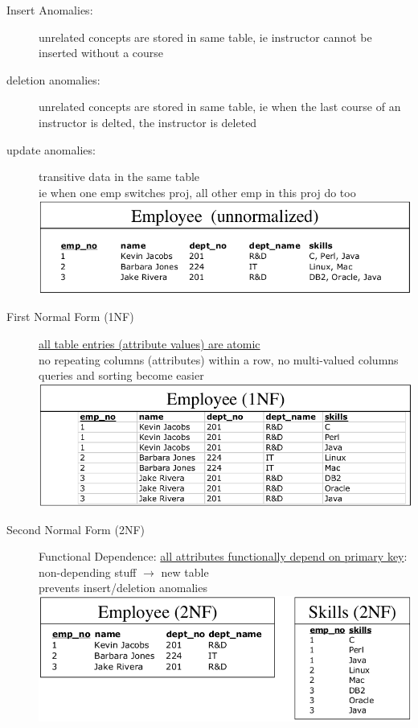 \documentclass{scrartcl}
\begin{document}
\begin{description}
	\item[Insert Anomalies:] unrelated concepts are stored in same table, ie instructor cannot be inserted without a course
	\item[deletion anomalies:] unrelated concepts are stored in same table, ie when the last course of an instructor is delted, the instructor is deleted
	\item[update anomalies:] transitive data in the same table \\
	ie when one emp switches proj, all other emp in this proj do too
\\	\includegraphics[scale=0.4]{unnormalized.png} 
	\item[First Normal Form (1NF)] \underline{all table entries (attribute values) are atomic} \\
	no repeating columns (attributes) within a row, no multi-valued columns \\
	queries and sorting become easier \\
	\includegraphics[scale=0.4]{1NF.png} 
	\item[Second Normal Form (2NF)]Functional Dependence: \underline{all attributes functionally depend on primary key}: non-depending stuff $\to$ new table\\
	prevents insert/deletion anomalies \\
	\includegraphics[scale=0.4]{2NF.png} 

\end{description}
\end{document}
